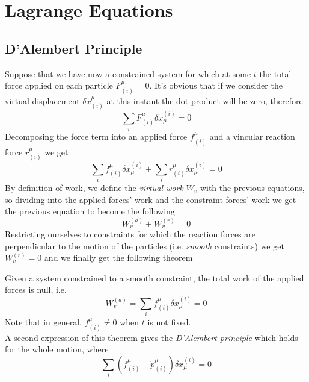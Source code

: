 \documentclass[../admech.tex]{subfiles}
\begin{document}
\section{Lagrange Equations}
\subsection{D'Alembert Principle}
Suppose that we have now a constrained system for which at some $t$ the total force applied on each particle $F^\mu_{(i)}=0$. It's obvious that if we consider the virtual displacement $\delta x^\mu_{(i)}$ at this instant the dot product will be zero, therefore
\begin{equation}
	\sum_{i}F^\mu_{(i)}\delta x^{(i)}_\mu=0
\end{equation}
Decomposing the force term into an applied force $f^\mu_{(i)}$ and a vincular reaction force $r^\mu_{(i)}$ we get
\begin{equation*}
	\sum_{i}f^\mu_{(i)}\delta x_\mu^{(i)}+\sum_ir^\mu_{(i)}\delta x_\mu^{(i)}=0
\end{equation*}
By definition of work, we define the \emph{virtual work} $W_v$ with the previous equations, so dividing into the applied forces' work and the constraint forces' work we get the previous equation to become the following
\begin{equation}
	W_v^{(a)}+W_v^{(r)}=0
	\label{eq:vwork}
\end{equation}
Restricting ourselves to constraints for which the reaction forces are perpendicular to the motion of the particles (i.e. \emph{smooth} constraints) we get $W^{(r)}_v=0$ and we finally get the following theorem
\begin{thm}
	Given a system constrained to a smooth constraint, the total work of the applied forces is null, i.e.
	\begin{equation}
		W_v^{(a)}=\sum_if^\mu_{(i)}\delta x_\mu^{(i)}=0
		\label{eq:vworkprinc}
	\end{equation}
	Note that in general, $f^\mu_{(i)}\ne0$ when $t$ is not fixed.\\
	A second expression of this theorem gives the \emph{D'Alembert principle} which holds for the whole motion, where
	\begin{equation}
		\sum_i(f^\mu_{(i)}-\dot{p}^\mu_{(i)})\delta x^{(i)}_\mu=0
		\label{eq:dalembertprinc}
	\end{equation}
\end{thm}
\end{document}
